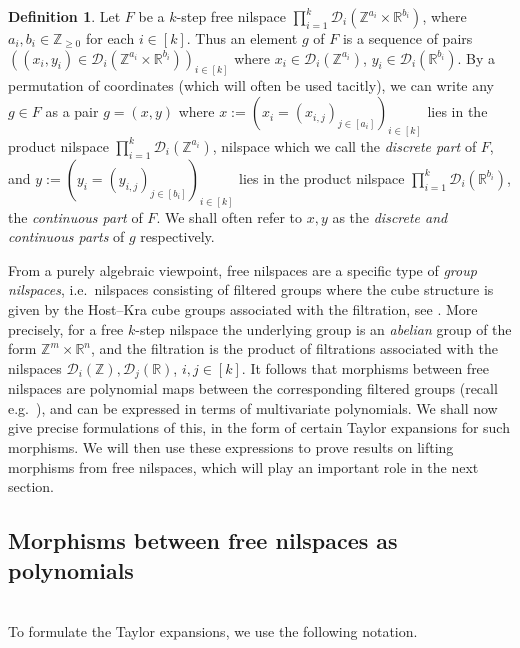 \documentclass[a4paper,12pt,reqno]{amsart}
\theoremstyle{definition}
\newtheorem{defn}[theorem]{Definition}
\newcommand{\mc}{\mathcal}
\newcommand{\mb}{\mathbb}
\begin{document}
\begin{defn}
Let $F$ be a $k$-step free nilspace $\prod_{i=1}^k \mc{D}_i(\mb{Z}^{a_i}\times \mb{R}^{b_i})$, where  $a_i,b_i\in\mb{Z}_{\ge 0}$ for each $i\in [k]$. Thus an element $g$ of $F$ is a sequence of pairs $\left((x_i,y_i)\in \mc{D}_i(\mb{Z}^{a_i}\times \mb{R}^{b_i})\right)_{i\in[k]}$ where $x_i\in \mc{D}_i(\mb{Z}^{a_i})$, $y_i\in \mc{D}_i(\mb{R}^{b_i})$. By a permutation of coordinates (which will often be used tacitly), we can write any $g\in F$ as a pair $g=(x,y)$ where $x:=(x_i=(x_{i,j})_{j\in [a_i]})_{i\in[k]}$ lies in the product nilspace $\prod_{i=1}^k \mc{D}_i(\mb{Z}^{a_i})$, nilspace which we call the \emph{discrete part} of $F$, and $y:=(y_i=(y_{i,j})_{j\in [b_i]})_{i\in[k]}$ lies in the product nilspace $\prod_{i=1}^k \mc{D}_i(\mb{R}^{b_i})$, the \emph{continuous part} of $F$. We shall often refer to $x,y$ as the \emph{discrete and continuous parts} of $g$ respectively.
\end{defn}

\noindent From a purely algebraic viewpoint, free nilspaces are a specific type of \emph{group nilspaces}, i.e.\ nilspaces consisting of filtered groups where the cube structure is given by the Host--Kra cube groups associated with the filtration, see \cite[Ch. 6]{HKbook}. More precisely, for a free $k$-step nilspace the underlying group is an \emph{abelian} group of the form $\mb{Z}^m\times \mb{R}^n$, and the filtration is the product of filtrations associated with the nilspaces $\mc{D}_i(\mb{Z}),\mc{D}_j(\mb{R})$, $i,j\in [k]$. It follows that morphisms between free nilspaces are polynomial maps between the corresponding filtered groups (recall e.g.\ \cite[Theorem 2.2.14]{Cand:Notes1}), and can be expressed in terms of multivariate polynomials. We shall now give precise formulations of this, in the form of certain Taylor expansions for such morphisms. We will then use these expressions to prove results on lifting morphisms from free nilspaces, which will play an important role in the next section.

\subsection{Morphisms between free nilspaces as polynomials}\hfill\\
To formulate the Taylor expansions, we use the following notation. 
\end{document}
